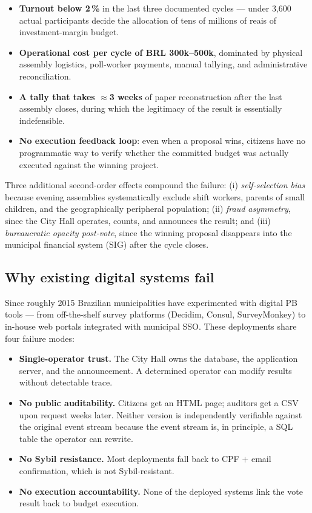 \documentclass[12pt]{article}
\begin{document}
\begin{itemize}
  \item \textbf{Turnout below 2\,\%} in the last three documented cycles ---
        under 3{,}600 actual participants decide the allocation of tens of
        millions of reais of investment-margin budget.
  \item \textbf{Operational cost per cycle of BRL 300k--500k}, dominated by
        physical assembly logistics, poll-worker payments, manual tallying,
        and administrative reconciliation.
  \item \textbf{A tally that takes \(\approx\)3 weeks} of paper reconstruction
        after the last assembly closes, during which the legitimacy of the
        result is essentially indefensible.
  \item \textbf{No execution feedback loop}: even when a proposal wins,
        citizens have no programmatic way to verify whether the committed
        budget was actually executed against the winning project.
\end{itemize}

Three additional second-order effects compound the failure: (i)
\textit{self-selection bias} because evening assemblies systematically
exclude shift workers, parents of small children, and the geographically
peripheral population; (ii) \textit{fraud asymmetry}, since the City Hall
operates, counts, and announces the result; and (iii) \textit{bureaucratic
opacity post-vote}, since the winning proposal disappears into the municipal
financial system (SIG) after the cycle closes.

\subsection{Why existing digital systems fail}
\label{sec:digital-fail}

Since roughly 2015 Brazilian municipalities have experimented with digital PB
tools --- from off-the-shelf survey platforms (Decidim, Consul, SurveyMonkey)
to in-house web portals integrated with municipal SSO. These deployments
share four failure modes:

\begin{itemize}
  \item \textbf{Single-operator trust.} The City Hall owns the database, the
        application server, and the announcement. A determined operator can
        modify results without detectable trace.
  \item \textbf{No public auditability.} Citizens get an HTML page; auditors
        get a CSV upon request weeks later. Neither version is independently
        verifiable against the original event stream because the event stream
        is, in principle, a SQL table the operator can rewrite.
  \item \textbf{No Sybil resistance.} Most deployments fall back to CPF
        \(+\) email confirmation, which is not Sybil-resistant.
  \item \textbf{No execution accountability.} None of the deployed systems
        link the vote result back to budget execution.
\end{itemize}
\end{document}

